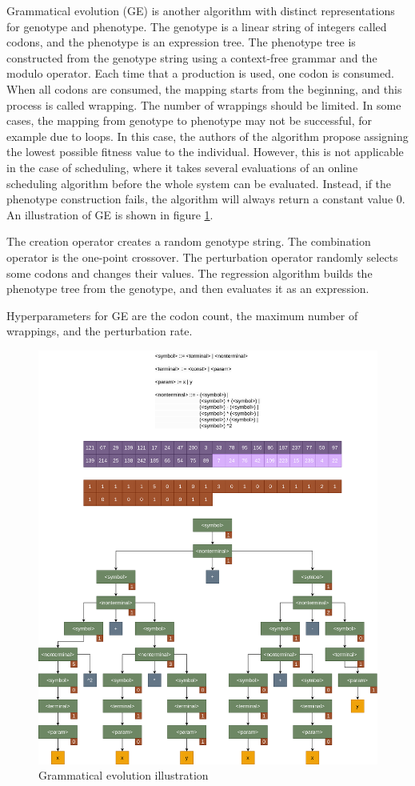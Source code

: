 Grammatical evolution (GE) \citep{ge} is another algorithm with distinct representations for genotype and phenotype. The genotype is a linear string of integers called codons, and the phenotype is an expression tree. The phenotype tree is constructed from the genotype string using a context-free grammar and the modulo operator. Each time that a production is used, one codon is consumed. When all codons are consumed, the mapping starts from the beginning, and this process is called wrapping. The number of wrappings should be limited. In some cases, the mapping from genotype to phenotype may not be successful, for example due to loops. In this case, the authors of the algorithm propose assigning the lowest possible fitness value to the individual. However, this is not applicable in the case of scheduling, where it takes several evaluations of an online scheduling algorithm before the whole system can be evaluated. Instead, if the phenotype construction fails, the algorithm will always return a constant value $0$. An illustration of GE is shown in figure \ref{fig:ge}.

The creation operator creates a random genotype string. The combination operator is the one-point crossover. The perturbation operator randomly selects some codons and changes their values. The regression algorithm builds the phenotype tree from the genotype, and then evaluates it as an expression.

Hyperparameters for GE are the codon count, the maximum number of wrappings, and the perturbation rate.

\begin{figure}[!htbp]
	\centering
	\includegraphics[scale=0.19]{../images/ge.png}
	\caption{Grammatical evolution illustration}
    \label{fig:ge}
\end{figure}

